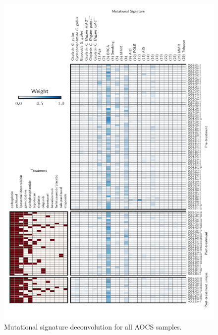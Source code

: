 \begin{figure}
\centering
\includegraphics[scale=1.0]{figures/supplementary_signatures.pdf}
\caption{Mutational signature deconvolution for all AOCS samples. }
\label{fig:supp_signatures}
\end{figure}

